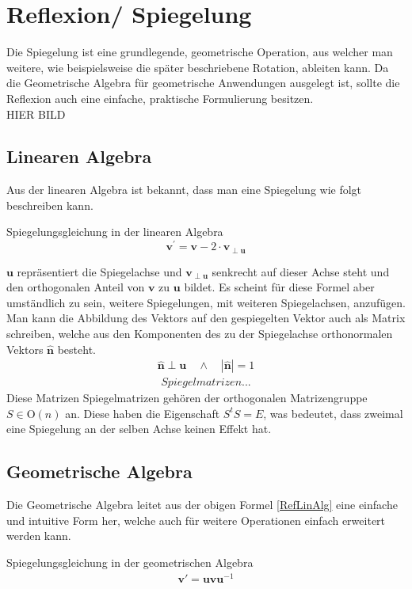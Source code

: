 %
%
%
\section{Reflexion/ Spiegelung}

Die Spiegelung ist eine grundlegende, geometrische Operation, aus welcher man weitere, wie beispielsweise die später beschriebene Rotation, ableiten kann. Da die Geometrische Algebra für geometrische Anwendungen ausgelegt ist, sollte die Reflexion auch eine einfache, praktische Formulierung besitzen. \\HIER BILD
\subsection{Linearen Algebra}
Aus der linearen Algebra ist bekannt, dass man eine Spiegelung wie folgt beschreiben kann.
\begin{definition}
	Spiegelungsgleichung in der linearen Algebra
	\begin{equation} \label{RefLinAlg}
		\mathbf{v^{'}} = \mathbf{v} - 2 \cdot \mathbf{v_{\perp u}}
	\end{equation}
\end{definition}

$\mathbf{u}$ repräsentiert die Spiegelachse und $\mathbf{v_{\perp u}}$ senkrecht auf dieser Achse steht und den orthogonalen Anteil von $\mathbf{v}$ zu $\mathbf{u}$ bildet. Es scheint für diese Formel aber umständlich zu sein, weitere Spiegelungen, mit weiteren Spiegelachsen, anzufügen. Man kann die Abbildung des Vektors auf den gespiegelten Vektor auch als Matrix schreiben, welche aus den Komponenten des zu der Spiegelachse orthonormalen Vektors $\mathbf{\hat{n}}$ besteht.
\begin{align} 
	\mathbf{\hat{n}}\perp \mathbf{u}\quad \land \quad |\mathbf{\hat{n}}| = 1
\end{align}
\begin{align} \label{Spiegelmatrizen}
	Spiegelmatrizen...
\end{align}
Diese Matrizen Spiegelmatrizen gehören der orthogonalen Matrizengruppe $S\in \text{O}(n)$ an. Diese haben die Eigenschaft $S^t S = E$, was bedeutet, dass zweimal eine Spiegelung an der selben Achse keinen Effekt hat.
\subsection{Geometrische Algebra}
Die Geometrische Algebra leitet aus der obigen Formel \eqref{RefLinAlg} eine einfache und intuitive Form her, welche auch für weitere Operationen einfach erweitert werden kann.
\begin{definition}
	Spiegelungsgleichung in der geometrischen Algebra
	\begin{align}\label{RefGA}
		\mathbf{v}' = \mathbf{uvu}^{-1}
	\end{align}
\end{definition}

